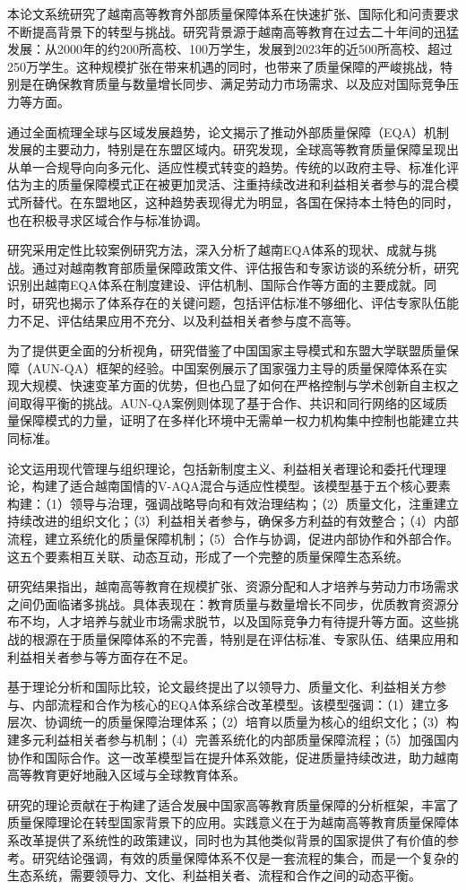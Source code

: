 \begin{cabstract}
本论文系统研究了越南高等教育外部质量保障体系在快速扩张、国际化和问责要求不断提高背景下的转型与挑战。研究背景源于越南高等教育在过去二十年间的迅猛发展：从2000年的约200所高校、100万学生，发展到2023年的近500所高校、超过250万学生。这种规模扩张在带来机遇的同时，也带来了质量保障的严峻挑战，特别是在确保教育质量与数量增长同步、满足劳动力市场需求、以及应对国际竞争压力等方面。

通过全面梳理全球与区域发展趋势，论文揭示了推动外部质量保障（EQA）机制发展的主要动力，特别是在东盟区域内。研究发现，全球高等教育质量保障呈现出从单一合规导向向多元化、适应性模式转变的趋势。传统的以政府主导、标准化评估为主的质量保障模式正在被更加灵活、注重持续改进和利益相关者参与的混合模式所替代。在东盟地区，这种趋势表现得尤为明显，各国在保持本土特色的同时，也在积极寻求区域合作与标准协调。

研究采用定性比较案例研究方法，深入分析了越南EQA体系的现状、成就与挑战。通过对越南教育部质量保障政策文件、评估报告和专家访谈的系统分析，研究识别出越南EQA体系在制度建设、评估机制、国际合作等方面的主要成就。同时，研究也揭示了体系存在的关键问题，包括评估标准不够细化、评估专家队伍能力不足、评估结果应用不充分、以及利益相关者参与度不高等。

为了提供更全面的分析视角，研究借鉴了中国国家主导模式和东盟大学联盟质量保障（AUN-QA）框架的经验。中国案例展示了国家强力主导的质量保障体系在实现大规模、快速变革方面的优势，但也凸显了如何在严格控制与学术创新自主权之间取得平衡的挑战。AUN-QA案例则体现了基于合作、共识和同行网络的区域质量保障模式的力量，证明了在多样化环境中无需单一权力机构集中控制也能建立共同标准。

论文运用现代管理与组织理论，包括新制度主义、利益相关者理论和委托代理理论，构建了适合越南国情的V-AQA混合与适应性模型。该模型基于五个核心要素构建：（1）领导与治理，强调战略导向和有效治理结构；（2）质量文化，注重建立持续改进的组织文化；（3）利益相关者参与，确保多方利益的有效整合；（4）内部流程，建立系统化的质量保障机制；（5）合作与协调，促进内部协作和外部合作。这五个要素相互关联、动态互动，形成了一个完整的质量保障生态系统。

研究结果指出，越南高等教育在规模扩张、资源分配和人才培养与劳动力市场需求之间仍面临诸多挑战。具体表现在：教育质量与数量增长不同步，优质教育资源分布不均，人才培养与就业市场需求脱节，以及国际竞争力有待提升等方面。这些挑战的根源在于质量保障体系的不完善，特别是在评估标准、专家队伍、结果应用和利益相关者参与等方面存在不足。

基于理论分析和国际比较，论文最终提出了以领导力、质量文化、利益相关方参与、内部流程和合作为核心的EQA体系综合改革模型。该模型强调：（1）建立多层次、协调统一的质量保障治理体系；（2）培育以质量为核心的组织文化；（3）构建多元利益相关者参与机制；（4）完善系统化的内部质量保障流程；（5）加强国内协作和国际合作。这一改革模型旨在提升体系效能，促进质量持续改进，助力越南高等教育更好地融入区域与全球教育体系。

研究的理论贡献在于构建了适合发展中国家高等教育质量保障的分析框架，丰富了质量保障理论在转型国家背景下的应用。实践意义在于为越南高等教育质量保障体系改革提供了系统性的政策建议，同时也为其他类似背景的国家提供了有价值的参考。研究结论强调，有效的质量保障体系不仅是一套流程的集合，而是一个复杂的生态系统，需要领导力、文化、利益相关者、流程和合作之间的动态平衡。
\end{cabstract}
